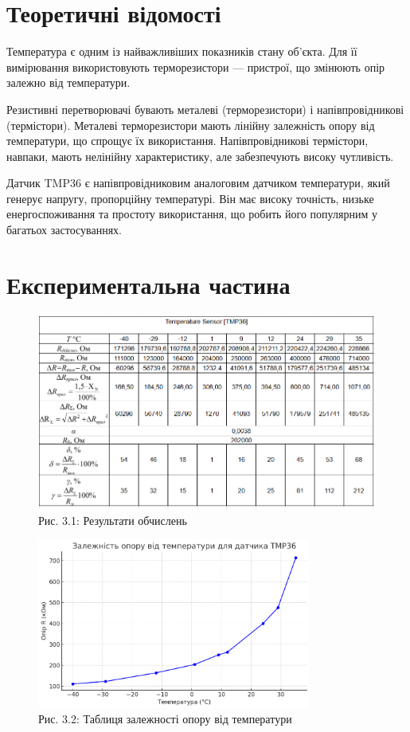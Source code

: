 \documentclass[a4paper]{article}
\begin{document}
\newpage 

\section*{Теоретичні відомості}
Температура є одним із найважливіших показників стану об'єкта. Для її вимірювання використовують терморезистори — пристрої, що змінюють опір залежно від температури.

Резистивні перетворювачі бувають металеві (терморезистори) і напівпровідникові (термістори). Металеві терморезистори мають лінійну залежність опору від температури, що спрощує їх використання. Напівпровідникові термістори, навпаки, мають нелінійну характеристику, але забезпечують високу чутливість.

Датчик TMP36 є напівпровідниковим аналоговим датчиком температури, який генерує напругу, пропорційну температурі. Він має високу точність, низьке енергоспоживання та простоту використання, що робить його популярним у багатьох застосуваннях.

\section*{Експериментальна частина}

\begin{figure}[h]
    \centering
\includegraphics[width=1\textwidth]{imgs/LW3.1.png}
    \caption*{Рис. 3.1: Результати обчислень}
\end{figure} 

\begin{figure}[h]
    \centering
\includegraphics[width=0.8\textwidth]{imgs/LW3.2.png}
    \caption*{Рис. 3.2: Таблиця залежності опору від температури}
\end{figure} 
\end{document}
